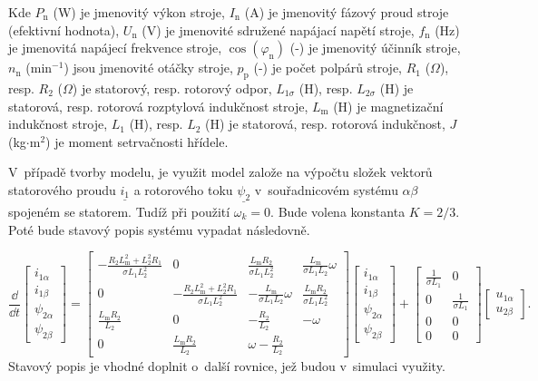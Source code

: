 \documentclass[a4paper, twoside, 11pt]{article}
\begin{document}
        \vspace*{1cm}
Kde $P_\text{n}$ (W) je jmenovitý výkon stroje, $I_\text{n}$ (A) je jmenovitý fázový proud stroje (efektivní hodnota), $U_\text{n}$ (V) je jmenovité sdružené napájací napětí stroje, $f_\text{n}$ (Hz) je jmenovitá napájecí frekvence stroje, $\cos(\varphi_\text{n})$ (-) je jmenovitý účinník stroje, $n_\text{n}$ (min$^{-1}$) jsou jmenovité otáčky stroje, $p_\text{p}$ (-) je počet polpárů stroje, $R_1$ ($\Omega$), resp. $R_2$ ($\Omega$) je statorový, resp. rotorový odpor, $L_{1\sigma}$ (H), resp. $L_{2\sigma}$ (H) je statorová, resp. rotorová rozptylová  indukčnost stroje, $L_\text{m}$ (H) je magnetizační indukčnost stroje, $L_1$ (H), resp. $L_2$ (H) je statorová, resp. rotorová indukčnost, $J$ (kg$\cdot$m$^{2}$) je moment setrvačnosti hřídele.\par
V~případě tvorby modelu, je využit model založe na výpočtu složek vektorů statorového proudu $\underline{i_1}$ a rotorového toku $\underline{\psi_2}$ v~souřadnicovém systému $\alpha\beta$ spojeném se statorem. Tudíž při použití $\omega_k = 0$. Bude volena konstanta $K = 2/3$. Poté bude stavový popis systému vypadat následovně.

\begin{equation}
    \frac{\dd{}}{\dd{t}}
    \begin{bmatrix}
        i_{1\alpha}\\
        i_{1\beta}\\
        \psi_{2\alpha}\\
        \psi_{2\beta}
    \end{bmatrix}
    =
    \begin{bmatrix}
        -\frac{R_2 L_\text{m}^{2} + L_2^2 R_1}{\sigma L_1 L_2^2} & 0 & \frac{L_\text{m} R_2}{\sigma L_1 L_2^2} & \frac{L_\text{m}}{\sigma L_1 L_2} \omega\\
        0 & - \frac{R_2 L_\text{m}^2 + L_2^2 R_1}{\sigma L_1 L_2^2} & - \frac{L_\text{m}}{\sigma L_1 L_2} \omega & \frac{L_\text{m} R_2}{\sigma L_1 L_2^2}\\
        \frac{L_\text{m} R_2}{L_2} & 0 & - \frac{R_2}{L_2} & -\omega\\
        0 & \frac{L_\text{m} R_2}{L_2} & \omega -\frac{R_2}{L_2}
    \end{bmatrix}
    \begin{bmatrix}
        i_{1\alpha}\\
        i_{1\beta}\\
        \psi_{2\alpha}\\
        \psi_{2\beta}
    \end{bmatrix}
    +
    \begin{bmatrix}
        \frac{1}{\sigma L_1} & 0\\
        0 & \frac{1}{\sigma L_1}\\
        0 & 0\\
        0 & 0
    \end{bmatrix}
    \begin{bmatrix}
        u_{1\alpha}\\
        u_{2\beta}
    \end{bmatrix}.
\end{equation}
Stavový popis je vhodné doplnit o~další rovnice, jež budou v~simulaci využity.
\end{document}
